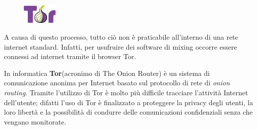 \begin{figure}
	\vspace{-20pt}
	\includegraphics[width=0.15\textwidth]{figure/torlogo}
\end{figure}
A causa di questo processo, tutto ciò non è praticabile all'interno di una rete internet standard. Infatti, per usufruire dei software di mixing occorre essere connessi ad internet tramite il browser Tor.

In informatica \textbf{Tor}(acronimo di The Onion Router) è un sistema di comunicazione anonima per Internet basato sul protocollo di rete di \textit{onion routing}. Tramite l'utilizzo di Tor è molto più difficile tracciare l'attività Internet dell'utente; difatti l'uso di Tor è finalizzato a proteggere la privacy degli utenti, la loro libertà e la possibilità di condurre delle comunicazioni confidenziali senza che vengano monitorate. \cite{wiki:tor}
